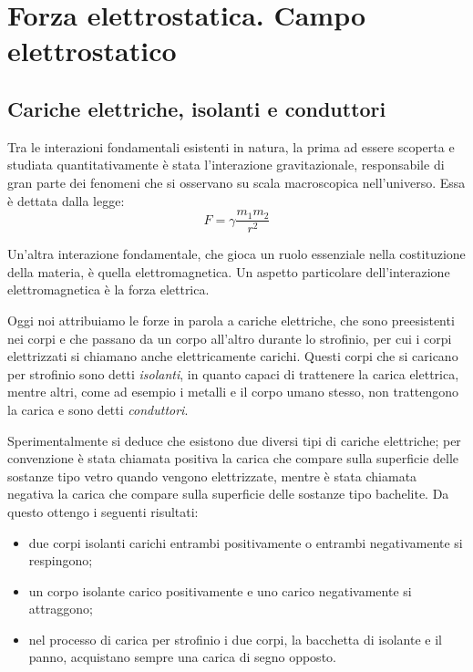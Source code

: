 \documentclass[class=book, crop=false, oneside, 12pt]{standalone}
\begin{document}
\chapter{Forza elettrostatica. Campo elettrostatico}

\section{Cariche elettriche, isolanti e conduttori}

Tra le interazioni fondamentali esistenti in natura, la prima ad essere scoperta e studiata quantitativamente è stata l'interazione gravitazionale, responsabile di gran parte dei fenomeni che si osservano su scala macroscopica nell'universo.
Essa è dettata dalla legge:
\begin{equation}
    F = \gamma \frac{m_1 m_2}{r^2}
\end{equation}

Un'altra interazione fondamentale, che gioca un ruolo essenziale nella costituzione della materia, è quella elettromagnetica. 
Un aspetto particolare dell'interazione elettromagnetica è la forza elettrica.

Oggi noi attribuiamo le forze in parola a cariche elettriche, che sono preesistenti nei corpi e che passano da un corpo all'altro durante lo strofinio, per cui i corpi elettrizzati si chiamano anche elettricamente carichi.
Questi corpi che si caricano per strofinio sono detti \emph{isolanti}, in quanto capaci di trattenere la carica elettrica, mentre altri, come ad esempio i metalli e il corpo umano stesso, non trattengono la carica e sono detti \emph{conduttori}.

Sperimentalmente si deduce che esistono due diversi tipi di cariche elettriche; per convenzione è stata chiamata positiva la carica che compare sulla superficie delle sostanze tipo vetro quando vengono elettrizzate, mentre è stata chiamata negativa la carica che compare sulla superficie delle sostanze tipo bachelite.
Da questo ottengo i seguenti risultati:
\begin{itemize}
    \item due corpi isolanti carichi entrambi positivamente o entrambi negativamente si respingono; 
    \item un corpo isolante carico positivamente e uno carico negativamente si attraggono; 
    \item nel processo di carica per strofinio i due corpi, la bacchetta di isolante e il panno, acquistano sempre una carica di segno opposto. 
\end{itemize}
\end{document}
